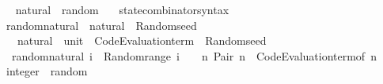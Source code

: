 \begin{isabellebody}
\isanewline
{}\isamarkupfalse%
%
\isadelimproof
\ %
\endisadelimproof
%
\isatagproof
\isacommand{{\isachardot}{\kern0pt}{\isachardot}{\kern0pt}}\isamarkupfalse%
%
\endisatagproof
{\isafoldproof}%
%
\isadelimproof
%
\endisadelimproof
\isanewline
\isanewline
{}\isamarkupfalse%
\isanewline
\isanewline
{}\isamarkupfalse%
\isanewline
\isanewline
{}\isamarkupfalse%
\ natural\ {\isacharcolon}{\kern0pt}{\isacharcolon}{\kern0pt}\ random\isanewline
{}\isanewline
\isanewline
{}\isamarkupfalse%
\isanewline
\ \ \ state{\isacharunderscore}{\kern0pt}combinator{\isacharunderscore}{\kern0pt}syntax\isanewline
{}\isanewline
\isanewline
{}\isamarkupfalse%
\ random{\isacharunderscore}{\kern0pt}natural\ {\isacharcolon}{\kern0pt}{\isacharcolon}{\kern0pt}\ {\isachardoublequoteopen}natural\ {\isasymRightarrow}\ Random{\isachardot}{\kern0pt}seed\isanewline
\ \ {\isasymRightarrow}\ {\isacharparenleft}{\kern0pt}natural\ {\isasymtimes}\ {\isacharparenleft}{\kern0pt}unit\ {\isasymRightarrow}\ Code{\isacharunderscore}{\kern0pt}Evaluation{\isachardot}{\kern0pt}term{\isacharparenright}{\kern0pt}{\isacharparenright}{\kern0pt}\ {\isasymtimes}\ Random{\isachardot}{\kern0pt}seed{\isachardoublequoteclose}\isanewline
{}\isanewline
\ \ {\isachardoublequoteopen}random{\isacharunderscore}{\kern0pt}natural\ i\ {\isacharequal}{\kern0pt}\ Random{\isachardot}{\kern0pt}range\ {\isacharparenleft}{\kern0pt}i\ {\isacharplus}{\kern0pt}\ {}{\isacharparenright}{\kern0pt}\ {\isasymcirc}{\isasymrightarrow}\ {\isacharparenleft}{\kern0pt}{\isasymlambda}n{\isachardot}{\kern0pt}\ Pair\ {\isacharparenleft}{\kern0pt}n{\isacharcomma}{\kern0pt}\ {\isasymlambda}{\isacharunderscore}{\kern0pt}{\isachardot}{\kern0pt}\ Code{\isacharunderscore}{\kern0pt}Evaluation{\isachardot}{\kern0pt}term{\isacharunderscore}{\kern0pt}of\ n{\isacharparenright}{\kern0pt}{\isacharparenright}{\kern0pt}{\isachardoublequoteclose}\isanewline
\isanewline
{}\isamarkupfalse%
%
\isadelimproof
\ %
\endisadelimproof
%
\isatagproof
\isacommand{{\isachardot}{\kern0pt}{\isachardot}{\kern0pt}}\isamarkupfalse%
%
\endisatagproof
{\isafoldproof}%
%
\isadelimproof
%
\endisadelimproof
\isanewline
\isanewline
{}\isamarkupfalse%
\isanewline
\isanewline
{}\isamarkupfalse%
\isanewline
\isanewline
{}\isamarkupfalse%
\ integer\ {\isacharcolon}{\kern0pt}{\isacharcolon}{\kern0pt}\ random\isanewline
{}\isanewline

\end{isabellebody}
